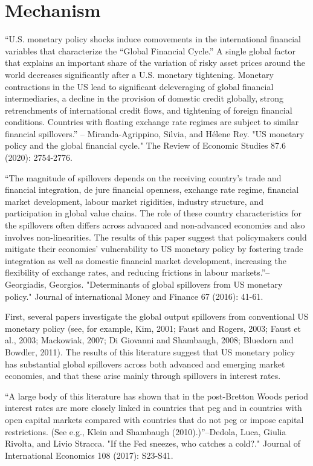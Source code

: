 \documentclass[12pt]{article}
\begin{document}
\section{Mechanism}


“U.S. monetary policy shocks induce comovements in the international financial variables that characterize the “Global Financial Cycle.” A single global factor that explains an important share of the variation of risky asset prices around the world decreases significantly after a U.S. monetary tightening. Monetary contractions in the US lead to significant deleveraging of global financial intermediaries, a decline in the provision of domestic credit globally, strong retrenchments of international credit flows, and tightening of foreign financial conditions. Countries with floating exchange rate regimes are subject to similar financial spillovers.” -- Miranda-Agrippino, Silvia, and Hélene Rey. "US monetary policy and the global financial cycle." The Review of Economic Studies 87.6 (2020): 2754-2776.

“The magnitude of spillovers depends on the receiving country's trade and financial integration, de jure financial openness, exchange rate regime, financial market development, labour market rigidities, industry structure, and participation in global value chains. The role of these country characteristics for the spillovers often differs across advanced and non-advanced economies and also involves non-linearities. The results of this paper suggest that policymakers could mitigate their economies' vulnerability to US monetary policy by fostering trade integration as well as domestic financial market development, increasing the flexibility of exchange rates, and reducing frictions in labour markets.”-- Georgiadis, Georgios. "Determinants of global spillovers from US monetary policy." Journal of international Money and Finance 67 (2016): 41-61.

First, several papers investigate the global output spillovers from conventional US monetary policy (see, for example, Kim, 2001; Faust and Rogers, 2003; Faust et al., 2003; Mackowiak, 2007; Di Giovanni and Shambaugh, 2008; Bluedorn and Bowdler, 2011). The results of this literature suggest that US monetary policy has substantial global spillovers across both advanced and emerging market economies, and that these arise mainly through spillovers in interest rates.


“A large body of this literature has shown that in the post-Bretton Woods period interest rates are more closely linked in countries that peg and in countries with open capital markets compared with countries that do not peg or impose capital restrictions. (See e.g., Klein and Shambaugh (2010).)”--Dedola, Luca, Giulia Rivolta, and Livio Stracca. "If the Fed sneezes, who catches a cold?." Journal of International Economics 108 (2017): S23-S41.
\end{document}

